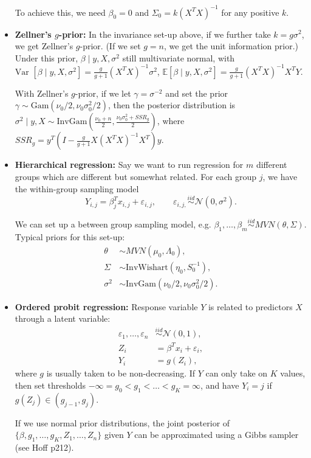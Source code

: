 \documentclass[twoside]{article}
\newcommand{\dis}{\displaystyle}
\newcommand\bbE{\mathbb{E}}
\newcommand\calN{\mathcal{N}}
\def\eps{\varepsilon}
\newcommand\Lmb{\Lambda}
\newcommand\sg{\sigma}
\newcommand\Sg{\Sigma}
\def\t{\theta}
\newcommand\var{\text{Var }}
\begin{document}
\begin{itemize}
To achieve this, we need $\beta_0 = 0$ and $\Sg_0 = k (X^T X)^{-1}$ for any positive $k$.

\item \textbf{Zellner's $g$-prior:} In the invariance set-up above, if we further take $k = g\sg^2$, we get Zellner's $g$-prior. (If we set $g = n$, we get the unit information prior.) Under this prior, $\beta \mid y, X, \sg^2$ still multivariate normal, with $\var [\beta \mid y, X, \sg^2] = \dis\frac{g}{g+1}(X^T X)^{-1}\sg^2$, $\bbE [\beta \mid y, X, \sg^2] = \dis\frac{g}{g+1}(X^T X)^{-1} X^T Y$.

With Zellner's $g$-prior, if we let $\gamma = \sg^{-2}$ and set the prior $\gamma \sim \text{Gam}(\nu_0/2, \nu_0 \sg_0^2/2)$, then the posterior distribution is $\sg^2 \mid y, X \sim \text{InvGam} \left( \dis\frac{\nu_0 + n}{2}, \frac{\nu_0 \sg_0^2 + SSR_g}{2} \right)$, where $SSR_g = y^T \left(I - \dis\frac{g}{g+1}X(X^T X)^{-1} X^T \right)y$.

\item \textbf{Hierarchical regression:} Say we want to run regression for $m$ different groups which are different but somewhat related. For each group $j$, we have the within-group sampling model
\[ Y_{i,j} = \beta_j^T x_{i,j} + \eps_{i,j}, \qquad \eps_{i,j,} \stackrel{iid}{\sim} \calN(0, \sg^2). \]

We can set up a between group sampling model, e.g. $\beta_1, \dots, \beta_m \stackrel{iid}{\sim} MVN(\t, \Sg)$. Typical priors for this set-up:
\begin{align*}
\t &\sim MVN(\mu_0, \Lmb_0), \\ 
\Sg &\sim \text{InvWishart}(\eta_0, S_0^{-1}), \\ 
\sg^2 &\sim \text{InvGam}(\nu_0 / 2, \nu_0 \sg_0^2 / 2).
\end{align*}

\item \textbf{Ordered probit regression:} Response variable $Y$ is related to predictors $X$ through a latent variable:
\begin{align*}
\eps_1, \dots, \eps_n &\stackrel{iid}{\sim} \calN(0, 1), \\ 
Z_i &= \beta^T x_i + \eps_i, \\ 
Y_i &= g(Z_i),
\end{align*}
where $g$ is usually taken to be non-decreasing. If $Y$ can only take on $K$ values, then set thresholds $-\infty = g_0 < g_1 < \dots < g_K = \infty$, and have $Y_i = j$ if $g(Z_j) \in (g_{j-1}, g_j)$.

If we use normal prior distributions, the joint posterior of $\{ \beta, g_1, \dots, g_K, Z_1, \dots, Z_n\}$ given $Y$ can be approximated using a Gibbs sampler (see Hoff p212).

\end{itemize}
\end{document}
